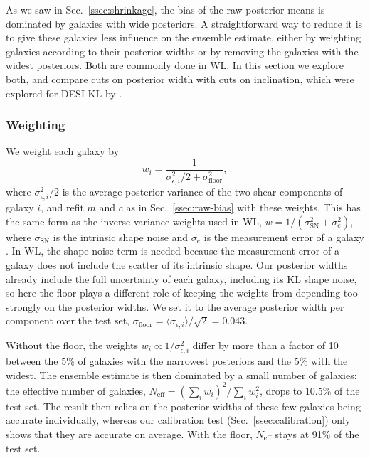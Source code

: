 As we saw in Sec.~\ref{ssec:shrinkage}, the bias of the raw posterior means is dominated by galaxies with wide posteriors. A straightforward way to reduce it is to give these galaxies less influence on the ensemble estimate, either by weighting galaxies according to their posterior widths or by removing the galaxies with the widest posteriors. Both are commonly done in WL. In this section we explore both, and compare cuts on posterior width with cuts on inclination, which were explored for DESI-KL by \citep{KLDESI}.

\subsubsection{Weighting}

We weight each galaxy by
\begin{equation}
\label{eqn:weights}
    w_i = \frac{1}{\sigma_{\epsilon,i}^2/2 + \sigma_\mathrm{floor}^2},
\end{equation}
where $\sigma_{\epsilon,i}^2/2$ is the average posterior variance of the two shear components of galaxy $i$, and refit $m$ and $c$ as in Sec.~\ref{ssec:raw-bias} with these weights. This has the same form as the inverse-variance weights used in WL, $w = 1/(\sigma_\mathrm{SN}^2 + \sigma_e^2)$, where $\sigma_\mathrm{SN}$ is the intrinsic shape noise and $\sigma_e$ is the measurement error of a galaxy \citep{HSCY1Shape}. In WL, the shape noise term is needed because the measurement error of a galaxy does not include the scatter of its intrinsic shape. Our posterior widths already include the full uncertainty of each galaxy, including its KL shape noise, so here the floor plays a different role of keeping the weights from depending too strongly on the posterior widths. We set it to the average posterior width per component over the test set, $\sigma_\mathrm{floor} = \langle\sigma_{\epsilon,i}\rangle/\sqrt{2} = 0.043$.

Without the floor, the weights $w_i \propto 1/\sigma_{\epsilon,i}^2$ differ by more than a factor of 10 between the 5\% of galaxies with the narrowest posteriors and the 5\% with the widest. The ensemble estimate is then dominated by a small number of galaxies: the effective number of galaxies, $N_\mathrm{eff} = (\sum_i w_i)^2/\sum_i w_i^2$, drops to 10.5\% of the test set. The result then relies on the posterior widths of these few galaxies being accurate individually, whereas our calibration test (Sec.~\ref{ssec:calibration}) only shows that they are accurate on average. With the floor, $N_\mathrm{eff}$ stays at 91\% of the test set.


